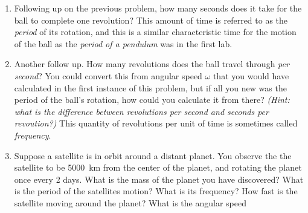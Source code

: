 \begin{enumerate}
\item
Following up on the previous problem, how many seconds does it take for the ball to complete one revolution? This amount of time is referred to as the \emph{period} of its rotation, and this is a similar characteristic time for the motion of the ball as the \emph{period of a pendulum} was in the first lab.

\item 
Another follow up. How many revolutions does the ball travel through \emph{per second}? You could convert this from angular speed $\omega$ that you would have calculated in the first instance of this problem, but if all you new was the period of the ball's rotation, how could you calculate it from there? \emph{(Hint: what is the difference between revolutions per second and seconds per revoution?)} This quantity of revolutions per unit of time is sometimes called \emph{frequency}.

\item 
Suppose a satellite is in orbit around a distant planet. You observe the the satellite to be \SI{5000}{\kilo\meter} from the 
center of the planet, and rotating the planet once every 2 days. What is the mass of the planet you have discovered? What is the period of the satellites motion? What is its frequency? How fast is the satellite moving around the planet? What is the angular speed



\end{enumerate}
